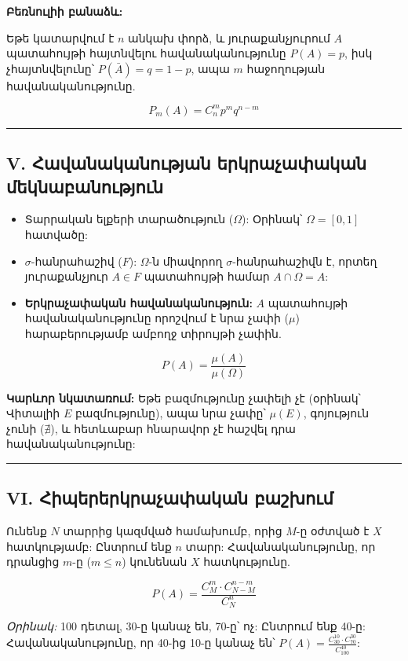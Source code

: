 \documentclass[12pt, a4paper]{article}
\begin{document}
\textbf{Բեռնուլիի բանաձև:}

Եթե կատարվում է $n$ անկախ փորձ, և յուրաքանչյուրում $A$ պատահույթի հայտնվելու հավանականությունը $P(A)=p$, իսկ չհայտնվելունը՝ $P(\bar{A})=q=1-p$, ապա $m$ հաջողության հավանականությունը.

$$P_m(A) = C_n^m p^m q^{n-m}$$

\vspace{1em}
\hrule
\vspace{1em}

\subsection{\textbf{V. Հավանականության երկրաչափական մեկնաբանություն}}

\begin{itemize}
    \item Տարրական ելքերի տարածություն ($\Omega$): Օրինակ՝ $\Omega = [0, 1]$ հատվածը:
    \item $\sigma$-հանրահաշիվ ($F$): $\Omega$-ն միավորող $\sigma$-հանրահաշիվն է, որտեղ յուրաքանչյուր $A \in F$ պատահույթի համար $A \cap \Omega = A$:
    \item \textbf{Երկրաչափական հավանականություն:} $A$ պատահույթի հավանականությունը որոշվում է նրա չափի ($\mu$) հարաբերությամբ ամբողջ տիրույթի չափին.
\end{itemize}

$$P(A) = \frac{\mu(A)}{\mu(\Omega)}$$

\textbf{Կարևոր նկատառում:} Եթե բազմությունը չափելի չէ (օրինակ՝ Վիտալիի $E$ բազմությունը), ապա նրա չափը՝ $\mu(E)$, գոյություն չունի ($\nexists$), և հետևաբար հնարավոր չէ հաշվել դրա հավանականությունը:

\vspace{1em}
\hrule
\vspace{1em}

\subsection{\textbf{VI. Հիպերերկրաչափական բաշխում}}

Ունենք $N$ տարրից կազմված համախումբ, որից $M$-ը օժտված է $X$ հատկությամբ: Ընտրում ենք $n$ տարր: Հավանականությունը, որ դրանցից $m$-ը ($m \leq n$) կունենան $X$ հատկությունը.

$$P(A) = \frac{C_M^m \cdot C_{N-M}^{n-m}}{C_N^n}$$

\textit{Օրինակ:} 100 դետալ, 30-ը կանաչ են, 70-ը՝ ոչ: Ընտրում ենք 40-ը: Հավանականությունը, որ 40-ից 10-ը կանաչ են՝ $P(A) = \frac{C_{30}^{10} \cdot C_{70}^{30}}{C_{100}^{40}}$:
\end{document}
